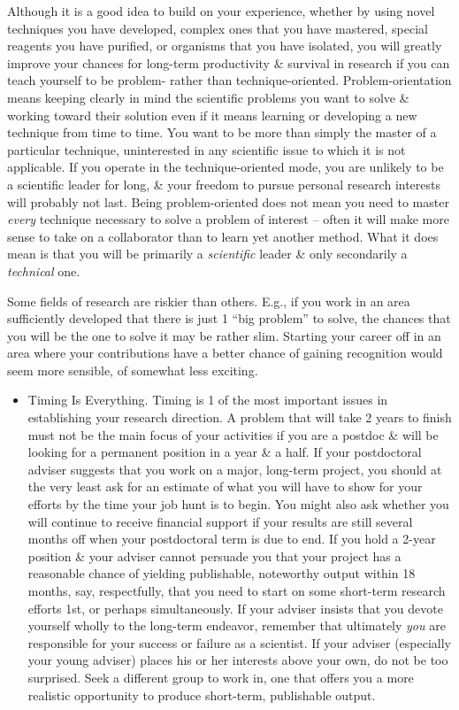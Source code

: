 \documentclass{article}
\begin{document}
\begin{enumerate}
\begin{itemize}
		Although it is a good idea to build on your experience, whether by using novel techniques you have developed, complex ones that you have mastered, special reagents you have purified, or organisms that you have isolated, you will greatly improve your chances for long-term productivity \& survival in research if you can teach yourself to be problem- rather than technique-oriented. Problem-orientation means keeping clearly in mind the scientific problems you want to solve \& working toward their solution even if it means learning or developing a new technique from time to time. You want to be more than simply the master of a particular technique, uninterested in any scientific issue to which it is not applicable. If you operate in the technique-oriented mode, you are unlikely to be a scientific leader for long, \& your freedom to pursue personal research interests will probably not last. Being problem-oriented does not mean you need to master {\it every} technique necessary to solve a problem of interest -- often it will make more sense to take on a collaborator than to learn yet another method. What it does mean is that you will be primarily a {\it scientific} leader \& only secondarily a {\it technical} one.
		
		Some fields of research are riskier than others. E.g., if you work in an area sufficiently developed that there is just 1 ``big problem'' to solve, the chances that you will be the one to solve it may be rather slim. Starting your career off in an area where your contributions have a better chance of gaining recognition would seem more sensible, of somewhat less exciting.
		\begin{itemize}
			\item {\sf Timing Is Everything.} Timing is 1 of the most important issues in establishing your research direction. A problem that will take 2 years to finish must not be the main focus of your activities if you are a postdoc \& will be looking for a permanent position in a year \& a half. If your postdoctoral adviser suggests that you work on a major, long-term project, you should at the very least ask for an estimate of what you will have to show for your efforts by the time your job hunt is to begin. You might also ask whether you will continue to receive financial support if your results are still several months off when your postdoctoral term is due to end. If you hold a 2-year position \& your adviser cannot persuade you that your project has a reasonable chance of yielding publishable, noteworthy output within 18 months, say, respectfully, that you need to start on some short-term research efforts 1st, or perhaps simultaneously. If your adviser insists that you devote yourself wholly to the long-term endeavor, remember that ultimately {\it you} are responsible for your success or failure as a scientist. If your adviser (especially your young adviser) places his or her interests above your own, do not be too surprised. Seek a different group to work in, one that offers you a more realistic opportunity to produce short-term, publishable output.
			

\end{itemize}
\end{itemize}
\end{enumerate}
\end{document}
